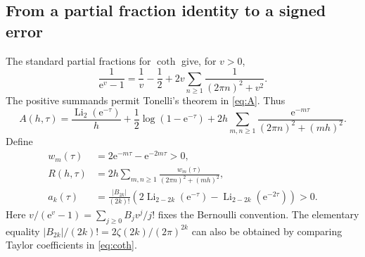 \documentclass[11pt,a4paper]{article}
\theoremstyle{definition}
\theoremstyle{remark}
\newcommand{\e}{\mathrm e}
\newcommand{\Li}{\operatorname{Li}}
\begin{document}
\subsection{From a partial fraction identity to a signed error}
The standard partial fractions for $\coth$ \cite{dlmfcoth} give, for $v>0$,
\begin{equation}
 \frac1{\e^v-1}=\frac1v-\frac12
       +2v\sum_{n\ge1}\frac1{(2\pi n)^2+v^2}.
 \label{eq:coth}
\end{equation}
The positive summands permit Tonelli's theorem in \eqref{eq:A}. Thus
\begin{equation}
 A(h,\tau)=\frac{\Li_2(\e^{-\tau})}{h}
 +\frac12\log(1-\e^{-\tau})
 +2h\sum_{m,n\ge1}\frac{\e^{-m\tau}}{(2\pi n)^2+(mh)^2}.
 \label{eq:Akernel}
\end{equation}
Define
\begin{align}
 w_m(\tau)&=2\e^{-m\tau}-\e^{-2m\tau}>0,\label{eq:weights}\\
 R(h,\tau)&=2h\sum_{m,n\ge1}
        \frac{w_m(\tau)}{(2\pi n)^2+(mh)^2},\label{eq:R}\\
 a_k(\tau)&=\frac{|B_{2k}|}{(2k)!}
  \left(2\Li_{2-2k}(\e^{-\tau})-\Li_{2-2k}(\e^{-2\tau})\right)>0.
 \label{eq:ak}
\end{align}
Here $v/(\e^v-1)=\sum_{j\ge0}B_jv^j/j!$ fixes the Bernoulli convention.
The elementary equality
$|B_{2k}|/(2k)!=2\zeta(2k)/(2\pi)^{2k}$ can also be obtained by comparing
Taylor coefficients in \eqref{eq:coth}.
\end{document}
